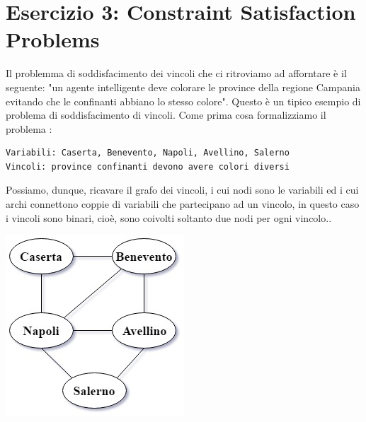 	\section{Esercizio 3: Constraint Satisfaction Problems}
		\label{sec:es3}
		Il problemma di soddisfacimento dei vincoli che ci ritroviamo ad afforntare è il seguente: "un agente intelligente  deve colorare le province della regione Campania evitando che le confinanti abbiano lo stesso colore". Questo è un tipico esempio di problema di soddisfacimento di vincoli. Come prima cosa formalizziamo il problema :
		\begin{lstlisting}
Variabili: Caserta, Benevento, Napoli, Avellino, Salerno
Vincoli: province confinanti devono avere colori diversi
		\end{lstlisting}
		Possiamo, dunque, ricavare il grafo dei vincoli, i cui nodi sono le variabili ed i cui archi connettono coppie di variabili che partecipano ad un vincolo, in questo caso i vincoli sono binari, cioè, sono coivolti soltanto due nodi per ogni vincolo..
		\begin{center}
			\includegraphics[scale=0.7]{ConstraintGraph.jpg}
		\end{center}
		
